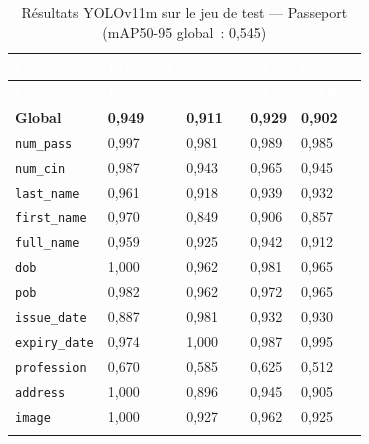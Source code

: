 \renewcommand{\arraystretch}{1.3}
\setlength{\LTleft}{0pt plus 1fill}
\setlength{\LTright}{0pt plus 1fill}
\begin{longtable}{|p{4cm}|p{2.7cm}|p{2.7cm}|p{2.7cm}|p{2.7cm}|}
  \hline
  \rowcolor{bleu_principal}
  \textcolor{white}{\textbf{Classe}} & \textcolor{white}{\textbf{Précision}} & \textcolor{white}{\textbf{Rappel}} & \textcolor{white}{\textbf{F1}} & \textcolor{white}{\textbf{mAP50}} \\
  \hline
  \endfirsthead
  \hline
  \rowcolor{bleu_principal}
  \textcolor{white}{\textbf{Classe}} & \textcolor{white}{\textbf{Précision}} & \textcolor{white}{\textbf{Rappel}} & \textcolor{white}{\textbf{F1}} & \textcolor{white}{\textbf{mAP50}} \\
  \hline
  \endhead
  \rowcolor{gris_leger}
  \textbf{Global} & \textbf{0,949} & \textbf{0,911} & \textbf{0,929} & \textbf{0,902} \\
  \hline
  \texttt{num\_pass}    & 0,997 & 0,981 & 0,989 & 0,985 \\
  \hline
  \texttt{num\_cin}     & 0,987 & 0,943 & 0,965 & 0,945 \\
  \hline
  \texttt{last\_name}   & 0,961 & 0,918 & 0,939 & 0,932 \\
  \hline
  \texttt{first\_name}  & 0,970 & 0,849 & 0,906 & 0,857 \\
  \hline
  \texttt{full\_name}   & 0,959 & 0,925 & 0,942 & 0,912 \\
  \hline
  \texttt{dob}          & 1,000 & 0,962 & 0,981 & 0,965 \\
  \hline
  \texttt{pob}          & 0,982 & 0,962 & 0,972 & 0,965 \\
  \hline
  \texttt{issue\_date}  & 0,887 & 0,981 & 0,932 & 0,930 \\
  \hline
  \texttt{expiry\_date} & 0,974 & 1,000 & 0,987 & 0,995 \\
  \hline
  \texttt{profession}   & 0,670 & 0,585 & 0,625 & 0,512 \\
  \hline
  \texttt{address}      & 1,000 & 0,896 & 0,945 & 0,905 \\
  \hline
  \texttt{image}        & 1,000 & 0,927 & 0,962 & 0,925 \\
  \hline
  \caption{Résultats YOLOv11m sur le jeu de test --- Passeport (mAP50-95 global~: 0,545)}
  \label{tab:yolo-test-passport}
\end{longtable}

